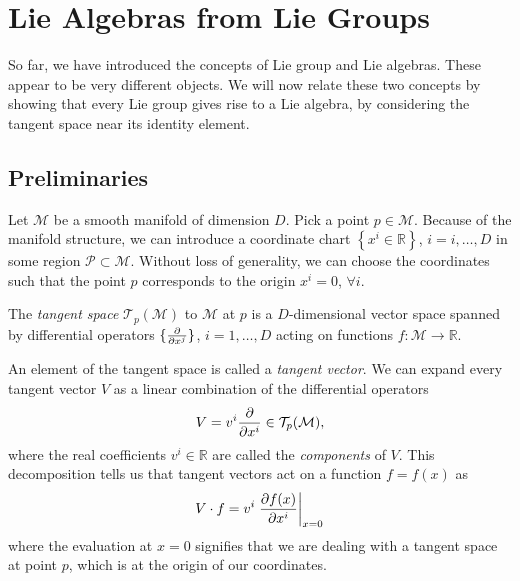 
\chapter{Lie Algebras from Lie Groups}%
\label{cha:lie_algebras_from_lie_groups}

So far, we have introduced the concepts of Lie group and Lie algebras.
These appear to be very different objects. We will now relate these two concepts by showing that every Lie group gives rise to a Lie algebra, by considering the tangent space near its identity element.

\section{Preliminaries}%
\label{sec:preliminaries}

Let $\mathcal{M}$ be a smooth manifold of dimension $D$. Pick a point $p \in \mathcal{M}$.
Because of the manifold structure, we can introduce a coordinate chart $\left\{ x^i \in \mathbb{R} \right\}$, $i = i, \ldots, D$ in some region $\mathcal{P} \subset \mathcal{M}$.
Without loss of generality, we can choose the coordinates such that the point $p$ corresponds to the origin $x^i = 0$, $\forall i$.

\begin{definition}
  The \emph{tangent space} $\mathcal{T}_p(\mathcal{M})$ to $\mathcal{M}$ at $p$ is a $D$-dimensional vector space spanned by differential operators $\{ \pdv{}{x^j} \}$, $i = 1, \ldots, D$ acting on functions $f: \mathcal{M} \to \mathbb{R}$.
\end{definition}

\begin{definition}
  An element of the tangent space is called a \emph{tangent vector}. We can expand every tangent vector $V$ as a linear combination of the differential operators
  \begin{equation}
    V = v^i \pdv{}{x^i} \in \mathcal{T}_p (\mathcal{M}),
  \end{equation}
  where the real coefficients $v^i \in \mathbb{R}$ are called the \emph{components} of $V$.
  This decomposition tells us that tangent vectors act on a function $f = f(x)$ as
  \begin{equation}
    V \cdot f = v^i \left.\pdv{f(x)}{x^i} \right\rvert_{x = 0}
  \end{equation}
  where the evaluation at $x = 0$ signifies that we are dealing with a tangent space at point $p$, which is at the origin of our coordinates.
\end{definition}

